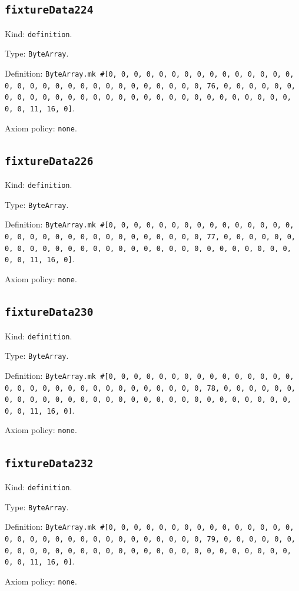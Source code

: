 \documentclass[11pt]{article}
\begin{document}
\subsection*{\texttt{fixtureData224}}
\noindent Kind: \texttt{definition}.\par
\noindent Type: \texttt{ByteArray}.\par
\noindent Definition: \texttt{ByteArray.mk \#[0, 0, 0, 0, 0, 0, 0, 0, 0, 0, 0, 0, 0, 0, 0, 0, 0, 0, 0, 0, 0, 0, 0, 0, 0, 0, 0, 0, 0, 0, 0, 76, 0, 0, 0, 0, 0, 0, 0, 0, 0, 0, 0, 0, 0, 0, 0, 0, 0, 0, 0, 0, 0, 0, 0, 0, 0, 0, 0, 0, 0, 0, 0, 11, 16, 0]}.\par
\noindent Axiom policy: \texttt{none}.\par
\subsection*{\texttt{fixtureData226}}
\noindent Kind: \texttt{definition}.\par
\noindent Type: \texttt{ByteArray}.\par
\noindent Definition: \texttt{ByteArray.mk \#[0, 0, 0, 0, 0, 0, 0, 0, 0, 0, 0, 0, 0, 0, 0, 0, 0, 0, 0, 0, 0, 0, 0, 0, 0, 0, 0, 0, 0, 0, 0, 77, 0, 0, 0, 0, 0, 0, 0, 0, 0, 0, 0, 0, 0, 0, 0, 0, 0, 0, 0, 0, 0, 0, 0, 0, 0, 0, 0, 0, 0, 0, 0, 11, 16, 0]}.\par
\noindent Axiom policy: \texttt{none}.\par
\subsection*{\texttt{fixtureData230}}
\noindent Kind: \texttt{definition}.\par
\noindent Type: \texttt{ByteArray}.\par
\noindent Definition: \texttt{ByteArray.mk \#[0, 0, 0, 0, 0, 0, 0, 0, 0, 0, 0, 0, 0, 0, 0, 0, 0, 0, 0, 0, 0, 0, 0, 0, 0, 0, 0, 0, 0, 0, 0, 78, 0, 0, 0, 0, 0, 0, 0, 0, 0, 0, 0, 0, 0, 0, 0, 0, 0, 0, 0, 0, 0, 0, 0, 0, 0, 0, 0, 0, 0, 0, 0, 11, 16, 0]}.\par
\noindent Axiom policy: \texttt{none}.\par
\subsection*{\texttt{fixtureData232}}
\noindent Kind: \texttt{definition}.\par
\noindent Type: \texttt{ByteArray}.\par
\noindent Definition: \texttt{ByteArray.mk \#[0, 0, 0, 0, 0, 0, 0, 0, 0, 0, 0, 0, 0, 0, 0, 0, 0, 0, 0, 0, 0, 0, 0, 0, 0, 0, 0, 0, 0, 0, 0, 79, 0, 0, 0, 0, 0, 0, 0, 0, 0, 0, 0, 0, 0, 0, 0, 0, 0, 0, 0, 0, 0, 0, 0, 0, 0, 0, 0, 0, 0, 0, 0, 11, 16, 0]}.\par
\noindent Axiom policy: \texttt{none}.\par
\end{document}
